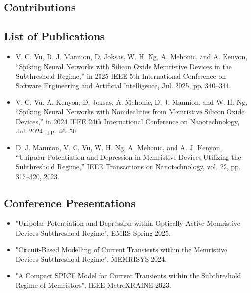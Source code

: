 \begin{impact}
\clearpage
\thispagestyle{empty}
\section*{\centering Contributions}

\subsection*{List of Publications}
\begin{itemize}
    \item V. C. Vu, D. J. Mannion, D. Joksas, W. H. Ng, A. Mehonic, and A. Kenyon, “Spiking Neural Networks with Silicon Oxide Memristive Devices in the Subthreshold Regime,” in 2025 IEEE 5th International Conference on Software Engineering and Artificial Intelligence, Jul. 2025, pp. 340–344.
    \item V. C. Vu, A. Kenyon, D. Joksas, A. Mehonic, D. J. Mannion, and W. H. Ng, “Spiking Neural Networks with Nonidealities from Memristive Silicon Oxide Devices,” in 2024 IEEE 24th International Conference on Nanotechnology, Jul. 2024, pp. 46–50.
    \item D. J. Mannion, V. C. Vu, W. H. Ng, A. Mehonic, and A. J. Kenyon, “Unipolar Potentiation and Depression in Memristive Devices Utilizing the Subthreshold Regime,” IEEE Transactions on Nanotechnology, vol. 22, pp. 313–320, 2023.
\end{itemize}

\subsection*{Conference Presentations}

\begin{itemize}
    \item "Unipolar Potentiation and Depression within Optically Active Memristive Devices Subthreshold Regime", EMRS Spring 2025.
    \item "Circuit-Based Modelling of Current Transients within the Memristive Devices Subthreshold Regime", MEMRISYS 2024.
    \item "A Compact SPICE Model for Current Transients within the Subthreshold Regime of Memristors", IEEE MetroXRAINE 2023.
  \end{itemize}

\end{impact}

